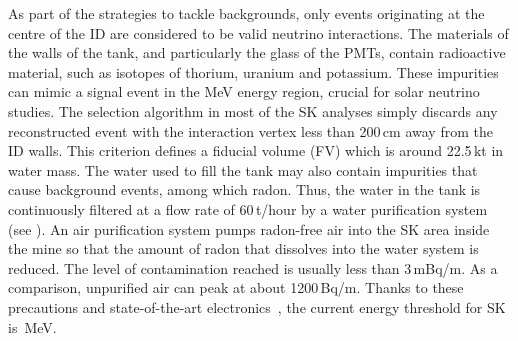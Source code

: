 As part of the strategies to tackle backgrounds, only events originating at the centre %
of the ID are considered to be valid neutrino interactions.
The materials of the walls of the tank, and particularly the glass of the PMTs, contain radioactive material, %
such as isotopes of thorium, uranium and potassium.
These impurities can mimic a signal event in the MeV energy region, crucial for solar neutrino studies.
The selection algorithm in most of the SK analyses simply discards any reconstructed event %
with the interaction vertex less than 200\,cm away from the ID walls.
This criterion defines a fiducial volume (FV) which is around 22.5\,kt in water mass.
The water used to fill the tank may also contain impurities that cause background events, among which radon.
Thus, the water in the tank is continuously filtered at a flow rate of 60\,t/hour %
by a water purification system (see ).
An air purification system pumps radon-free air into the SK area inside the mine %
so that the amount of radon that dissolves into the water system is reduced.
The level of contamination reached is usually less than 3\,mBq/m.
As a comparison, unpurified air can peak at about 1200\,Bq/m.
Thanks to these precautions and state-of-the-art electronics~\cite{Nishino:2009zu}, the current energy threshold for SK is \,MeV.


